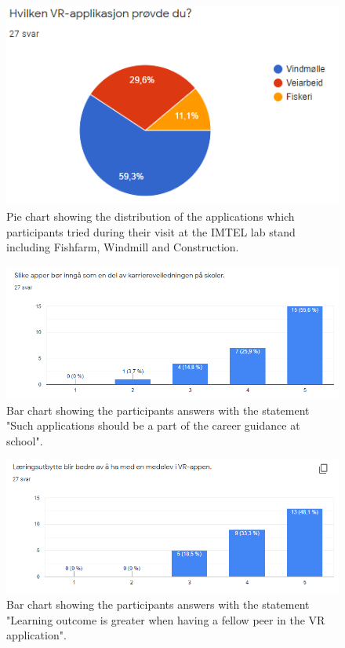 \begin{figure}[!h]
    \centering
    \captionsetup{width=.6\linewidth}
    \includegraphics[width=.6\textwidth]{./fig/phase_1/researcherNight/RN_Apps.PNG}
    \caption{Pie chart showing the distribution of the applications which participants tried during their visit at the IMTEL lab stand including Fishfarm, Windmill and Construction. }
    \label{fig:RN_Apps}
\end{figure}

\begin{figure}[!h]
    \centering
    \captionsetup{width=.7\linewidth}
    \includegraphics[width=.8\textwidth]{./fig/phase_1/researcherNight/RN_careerguidenceSchool.PNG}
    \caption{Bar chart showing the participants answers with the statement "Such applications should be a part of the career guidance at school".}
    \label{fig:RN_careerguidenceSchool}
\end{figure}

\begin{figure}[!h]
    \centering
    \captionsetup{width=.7\linewidth}
    \includegraphics[width=.8\textwidth]{./fig/phase_1/researcherNight/RN_VRpeer.PNG}
    \caption{Bar chart showing the participants answers with the statement "Learning outcome is greater when having a fellow peer in the VR application".}
    \label{fig:RN_VRpeer}
\end{figure}

